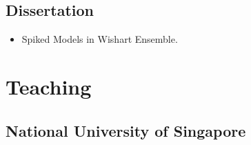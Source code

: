 \subsection*{Dissertation }
\begin{itemize}
\item
  Spiked Models in Wishart Ensemble.
\end{itemize}

\section*{Teaching }

\subsection*{National University of Singapore }


